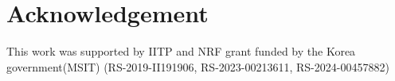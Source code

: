 \section{Acknowledgement}

This work was supported by IITP and NRF grant funded by the Korea government(MSIT) (RS-2019-II191906, RS-2023-00213611, RS-2024-00457882)